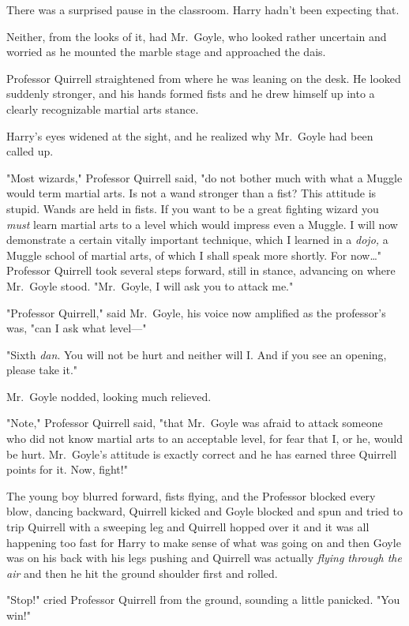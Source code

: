 There was a surprised pause in the classroom. Harry hadn't been expecting that.

Neither, from the looks of it, had Mr.~Goyle, who looked rather uncertain and 
worried as he mounted the marble stage and approached the dais.

Professor Quirrell straightened from where he was leaning on the desk. He 
looked suddenly stronger, and his hands formed fists and he drew himself up 
into a clearly recognizable martial arts stance.

Harry's eyes widened at the sight, and he realized why Mr.~Goyle had been 
called up.

"Most wizards," Professor Quirrell said, "do not bother much with what a Muggle 
would term martial arts. Is not a wand stronger than a fist? This attitude is 
stupid. Wands are held in fists. If you want to be a great fighting wizard you 
\emph{must} learn martial arts to a level which would impress even a Muggle. I 
will now demonstrate a certain vitally important technique, which I learned in 
a \emph{dojo,} a Muggle school of martial arts, of which I shall speak more 
shortly. For now{\ldots}" Professor Quirrell took several steps forward, still 
in stance, advancing on where Mr.~Goyle stood. "Mr.~Goyle, I will ask you to 
attack me."

"Professor Quirrell," said Mr.~Goyle, his voice now amplified as the 
professor's was, "can I ask what level---"

"Sixth \emph{dan}. You will not be hurt and neither will I. And if you see an 
opening, please take it."

Mr.~Goyle nodded, looking much relieved.

"Note," Professor Quirrell said, "that Mr.~Goyle was afraid to attack someone 
who did not know martial arts to an acceptable level, for fear that I, or he, 
would be hurt. Mr.~Goyle's attitude is exactly correct and he has earned three 
Quirrell points for it. Now, fight!"

The young boy blurred forward, fists flying, and the Professor blocked every 
blow, dancing backward, Quirrell kicked and Goyle blocked and spun and tried to 
trip Quirrell with a sweeping leg and Quirrell hopped over it and it was all 
happening too fast for Harry to make sense of what was going on and then Goyle 
was on his back with his legs pushing and Quirrell was actually \emph{flying 
through the air} and then he hit the ground shoulder first and rolled.

"Stop!" cried Professor Quirrell from the ground, sounding a little panicked. 
"You win!"

